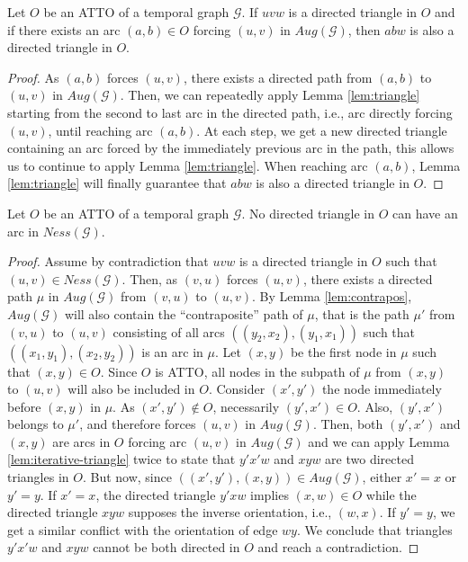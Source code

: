 \documentclass[runningheads]{llncs}
\begin{document}
\begin{lemma}
Let $O$ be an ATTO of a temporal graph   $\mathcal{G}$. If $uvw$ is a directed triangle in $O$ and if there exists an arc $(a,b) \in O$ forcing $(u,v)$ in $Aug(\mathcal{G})$, then $abw$ is also a directed triangle in $O$.
\label{lem:iterative-triangle}
\end{lemma}

\begin{proof}
As $(a,b)$ forces $(u,v)$, there exists a directed path from $(a,b)$ to $(u,v)$ in $Aug(\mathcal{G})$. Then, we can repeatedly apply Lemma \ref{lem:triangle} starting from the second to last arc in the directed path, i.e., arc directly forcing $(u,v)$, until reaching arc $(a,b)$. At each step, we get a new  directed triangle containing an arc forced by the immediately previous arc in the path, this allows us to continue to apply Lemma \ref{lem:triangle}.  When reaching arc $(a,b)$, Lemma \ref{lem:triangle} will finally guarantee that $abw$ is also a directed triangle in $O$.
\end{proof}

\begin{lemma}
\label{lem:atto-directed-triangle-no-arc-in-ness}
Let $O$ be an ATTO of a temporal graph $\mathcal{G}$. No directed triangle in $O$ can have an arc in $Ness(\mathcal{G})$.
\end{lemma}
\begin{proof}
Assume by contradiction that  $uvw$ is a directed triangle in $O$ such that $(u,v)\in Ness(\mathcal{G})$. Then, as $(v,u)$ forces $(u,v)$, there exists a directed path $\mu$ in $Aug(\mathcal{G})$ from $(v,u)$ to $(u,v)$. By Lemma \ref{lem:contrapos}, $Aug(\mathcal{G})$ will also contain the \enquote{contraposite} path of $\mu$, that is the path $\mu'$ from $(v,u)$ to $(u,v)$ consisting of all arcs $((y_2,x_2),(y_1,x_1))$ such that  $((x_1,y_1),(x_2,y_2))$ is an arc in $\mu$. Let $(x,y)$ be the first node in $\mu$ such that $(x,y) \in O$. Since $O$ is ATTO, all nodes in the subpath of $\mu$ from $(x,y)$ to $(u,v)$ will also be included in $O$. Consider $(x',y')$ the node immediately before $(x,y)$ in $\mu$. As $(x',y') \notin O$, necessarily $(y',x') \in O$. Also, $(y',x')$ belongs to $\mu'$, and therefore forces $(u,v)$ in $Aug(\mathcal{G})$. Then, both $(y',x')$ and $(x,y)$ are arcs in $O$ forcing arc $(u,v)$ in $Aug(\mathcal{G})$ and we can apply Lemma \ref{lem:iterative-triangle} twice to state that $y'x'w$ and $xyw$ are two directed triangles in $O$. But now, since $((x',y'),(x,y)) \in Aug(\mathcal{G})$, either $x' = x$ or $y' = y$. If $x' = x$, the directed triangle $y'xw$ implies $(x,w)\in O$ while the directed triangle $xyw$ supposes the inverse orientation, i.e., $(w,x)$. If $y' = y$, we get a similar conflict with the orientation of edge $wy$. We conclude that triangles $y'x'w$ and $xyw$ cannot be both directed in $O$ and reach a contradiction.
\end{proof}
\end{document}
